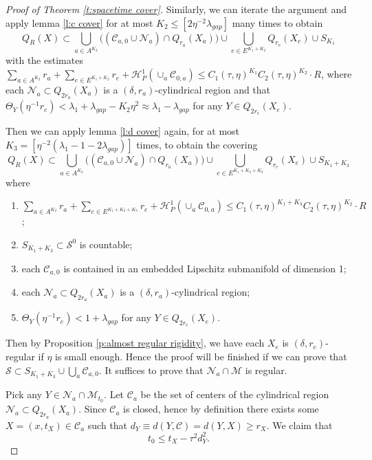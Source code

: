 \documentclass[11pt,reqno]{amsart}
\numberwithin{equation}{section}
\newcommand{\cC}{\mathcal{C}}
\newcommand{\cH}{\mathcal{H}}
\newcommand{\cM}{\mathcal{M}}
\newcommand{\cN}{\mathcal{N}}
\newcommand{\cS}{\mathcal{S}}
\theoremstyle{definition}
\theoremstyle{remark}
\theoremstyle{remark}
\theoremstyle{remark}
\theoremstyle{remark}\newtheorem{conjecture}[equation]{Conjecture}
\theoremstyle{remark}\newtheorem{question}[equation]{Question}
\begin{document}
\begin{proof}[Proof of Theorem \ref{t:spacetime cover}]
Similarly, we can iterate the argument and apply lemma \ref{l:c cover} for at most $K_2 \le [2\eta^{-2} \lambda_{gap}]$ many times to obtain
\begin{equation*}
        Q_R(X) \subset \bigcup_{a\in A^{K_2}} \big( (\cC_{a,0} \cup \cN_a) \cap Q_{r_a}(X_a) \big) \cup \bigcup_{e \in E^{K_1+K_2}} Q_{r_e}(X_e) \cup S_{K_1}
    \end{equation*}
with the estimates $\sum_{a \in A^{K_2}} r_a +\sum_{e\in E^{K_1+K_2} } r_e + \cH^1_P(\cup_a \cC_{0,a}) \le C_1(\tau,\eta)^{K_1} C_2(\tau,\eta)^{K_2} \cdot R$, where each $\cN_a \subset Q_{2r_a}(X_a)$ is a $(\delta,r_a)$-cylindrical region and that $\Theta_Y(\eta^{-1}r_e) < \lambda_1 +\lambda_{gap}- K_2\eta^{2} \approx \lambda_1 - \lambda_{gap}$ for any $Y \in Q_{2r_e}(X_e)$. 

Then we can apply lemma \ref{l:d cover} again, for at most $K_3 = [\eta^{-2}(\lambda_1-1-2\lambda_{gap})]$ times, to obtain the covering
\begin{equation*}
        Q_R(X) \subset \bigcup_{a\in A^{K_2}} \big( (\cC_{a,0} \cup \cN_a) \cap Q_{r_a}(X_a) \big) \cup \bigcup_{e \in E^{K_1+K_2+K_3}} Q_{r_e}(X_e) \cup S_{K_1+K_3}
    \end{equation*}
where
\begin{enumerate}
    \item $\sum_{a \in A^{K_2}} r_a +\sum_{e\in E^{K_1+K_2+K_3} } r_e + \cH^1_P(\cup_a \cC_{0,a}) \le C_1(\tau,\eta)^{K_1+K_3} C_2(\tau,\eta)^{K_2}  \cdot R$;
    \item $S_{K_1+K_3} \subset \cS^0$ is countable;
    \item each $\cC_{a,0}$ is contained in an embedded Lipschitz submanifold of dimension 1;
    \item each $\cN_a \subset Q_{2r_a}(X_a)$ is a $(\delta,r_a)$-cylindrical region;
    \item $\Theta_Y(\eta^{-1}r_e) < 1 +\lambda_{gap}$ for any $Y \in Q_{2r_e}(X_e)$. 
\end{enumerate}

Then by Proposition \ref{p:almost regular rigidity}, we have each $X_e$ is $(\delta,r_e)$-regular if $\eta$ is small enough. Hence the proof will be finished if we can prove that $\cS \subset S_{K_1+K_3} \cup \bigcup_a \cC_{a,0}$. It suffices to prove that $\cN_a\cap \cM$ is regular. 

Pick any $Y \in \cN_a \cap \cM_{t_0}$. Let $\cC_a$ be the set of centers of the cylindrical region $\cN_a\subset Q_{2r_a}(X_a)$. Since $\cC_a$ is closed, hence by definition there exists some $X=(x,t_X) \in \cC_a$ such that $d_Y \equiv d(Y,\cC) = d(Y,X) \ge r_X$. We claim that
\begin{equation}\label{e:rapid clear}
    t_0 \le t_X - \tau^2 d_Y^2.
\end{equation}


\end{proof}
\end{document}
